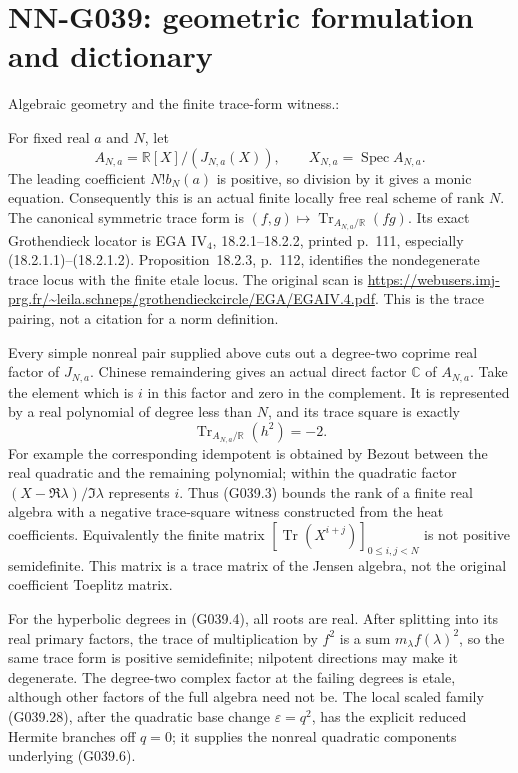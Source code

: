 \section{NN-G039: geometric formulation and dictionary}
\begin{geometricstatement}[NN-G039]
Algebraic geometry and the finite trace-form witness.:

For fixed real $a$ and $N$, let
\[
        A_{N,a}=\mathbb R[X]/(J_{N,a}(X)),\qquad
        X_{N,a}=\operatorname{Spec}A_{N,a}.
 \tag{G039.29}
\]
The leading coefficient $N!b_N(a)$ is positive, so division
by it gives a monic equation. Consequently this is an actual
finite locally free real scheme of rank $N$.
The canonical symmetric trace form is
$(f,g)\mapsto\operatorname{Tr}_{A_{N,a}/\mathbb R}(fg)$.
Its exact Grothendieck locator is EGA IV$_4$, 18.2.1--18.2.2,
printed p.~111, especially (18.2.1.1)--(18.2.1.2).
Proposition~18.2.3, p.~112, identifies the nondegenerate
trace locus with the finite etale locus.
The original scan is
\url{https://webusers.imj-prg.fr/~leila.schneps/grothendieckcircle/EGA/EGAIV.4.pdf}.
This is the trace pairing, not a citation for a norm definition.

Every simple nonreal pair supplied above cuts out a degree-two
coprime real factor of $J_{N,a}$. Chinese remaindering gives
an actual direct factor $\mathbb C$ of $A_{N,a}$.
Take the element which is $i$ in this factor and zero in the
complement. It is represented by a real polynomial of degree
less than $N$, and its trace square is exactly
\[
                   \operatorname{Tr}_{A_{N,a}/\mathbb R}(h^2)=-2.
 \tag{G039.30}
\]
For example the corresponding idempotent is obtained by Bezout
between the real quadratic and the remaining polynomial;
within the quadratic factor $(X-\Re\lambda)/\Im\lambda$
represents $i$.
Thus (G039.3) bounds the rank of a finite real algebra with a
negative trace-square witness constructed from the heat
coefficients. Equivalently the finite matrix
$[\operatorname{Tr}(X^{i+j})]_{0\le i,j<N}$ is not positive
semidefinite. This matrix is a trace matrix of the Jensen
algebra, not the original coefficient Toeplitz matrix.

For the hyperbolic degrees in (G039.4), all roots are real.
After splitting into its real primary factors, the trace of
multiplication by $f^2$ is a sum $m_\lambda f(\lambda)^2$,
so the same trace form is positive semidefinite; nilpotent
directions may make it degenerate.
The degree-two complex factor at the failing degrees is etale,
although other factors of the full algebra need not be.
The local scaled family (G039.28), after the quadratic base
change $\varepsilon=q^2$, has the explicit reduced Hermite
branches off $q=0$; it supplies the nonreal quadratic
components underlying (G039.6).


\end{geometricstatement}
